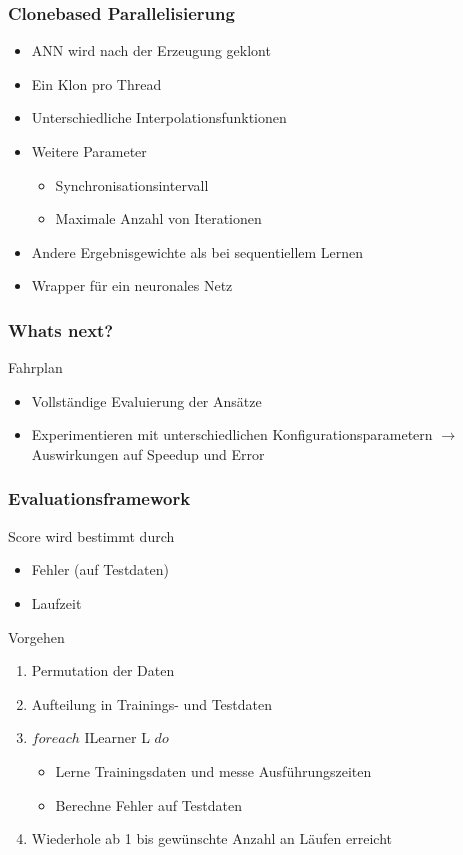 \documentclass[18pt]{beamer}
\begin{document}
	\begin{frame}\frametitle{Clonebased Parallelisierung}
		\begin{itemize}
			\item ANN wird nach der Erzeugung \glqq geklont\grqq
			\item Ein Klon pro Thread
			\item Unterschiedliche Interpolationsfunktionen
			\item Weitere Parameter
			\begin{itemize}
				\item Synchronisationsintervall
				\item Maximale Anzahl von Iterationen
			\end{itemize}				
			\item Andere Ergebnisgewichte als bei sequentiellem Lernen
			\item Wrapper für ein neuronales Netz
		\end{itemize}
	\end{frame}

	\begin{frame}\frametitle{Whats next?}
		\begin{block}{Fahrplan}
		    \begin{itemize}
		    	\item Vollständige Evaluierung der Ansätze
		    	\item Experimentieren mit unterschiedlichen Konfigurationsparametern $\rightarrow$ Auswirkungen auf Speedup und Error
		    \end{itemize}
		\end{block}
	\end{frame}

\beginbackup
	
	\begin{frame}[c]\frametitle{Evaluationsframework}
		\begin{block}{Score}
			wird bestimmt durch
		    \begin{itemize}
		    	\item Fehler (auf Testdaten)
		    	\item Laufzeit
		    \end{itemize}
		\end{block}
		\begin{block}{Vorgehen}
		    \begin{enumerate}
		    	\item Permutation der Daten
		    	\item Aufteilung in Trainings- und Testdaten
				\item $foreach$ ILearner L $do$
				\begin{itemize}
					\item Lerne Trainingsdaten und messe Ausführungszeiten
					\item Berechne Fehler auf Testdaten
				\end{itemize}
				\item Wiederhole ab 1 bis gewünschte Anzahl an Läufen erreicht
		    \end{enumerate}
		\end{block}
	\end{frame}
	
\end{document}
